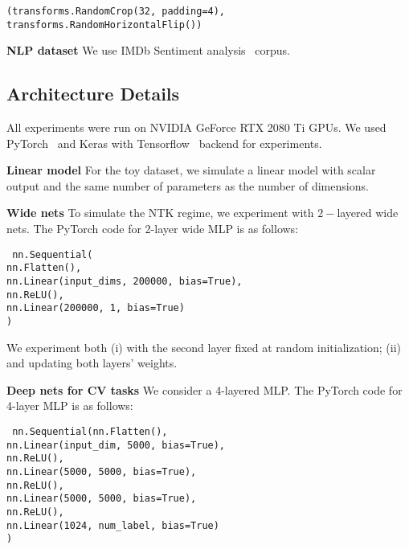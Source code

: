 \texttt{(transforms.RandomCrop(32, padding=4),\\
\tab transforms.RandomHorizontalFlip())}

\textbf{NLP dataset {} {}} We use IMDb Sentiment analysis~\citep{maas2011learning} corpus.  

\subsection{Architecture Details} 

All experiments were run on NVIDIA GeForce RTX 2080 Ti GPUs. We used PyTorch~\citep{NEURIPS2019a9015} and Keras with Tensorflow~\citep{abadi2016tensorflow} backend for experiments. 

\textbf{Linear model {} {}} For the toy dataset, we simulate a linear model with scalar output and the same number of parameters as the number of dimensions.   

\textbf{Wide nets {} {}} To simulate the NTK regime, we experiment with $2-$layered wide nets. The PyTorch code for 2-layer wide MLP is as follows: 


\texttt{ nn.Sequential( \\
\tab     nn.Flatten(),\\
\tab    nn.Linear(input\_dims, 200000, bias=True),\\
\tab    nn.ReLU(),\\
\tab    nn.Linear(200000, 1, bias=True)\\
\tab     )}


We experiment both (i) with the second layer fixed at random initialization; (ii)  and updating both layers' weights.     

\textbf{Deep nets for CV tasks {} {}} We consider a 4-layered MLP. The PyTorch code for 4-layer MLP is as follows: 

\texttt{ nn.Sequential(nn.Flatten(), \\
\tab        nn.Linear(input\_dim, 5000, bias=True),\\
\tab        nn.ReLU(),\\
\tab        nn.Linear(5000, 5000, bias=True),\\
\tab        nn.ReLU(),\\
\tab        nn.Linear(5000, 5000, bias=True),\\
\tab        nn.ReLU(),\\
\tab        nn.Linear(1024, num\_label, bias=True)\\
\tab        )}

